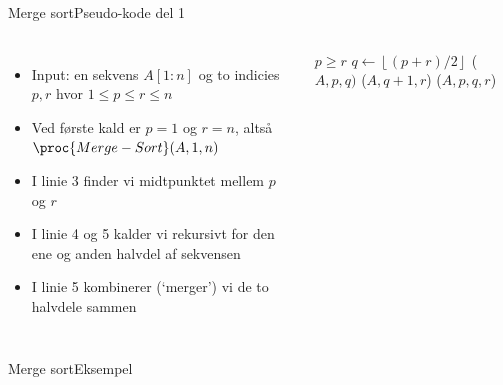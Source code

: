 \documentclass{beamer}
\newcommand{\floor}[1]{\left\lfloor #1 \right\rfloor}
\begin{document}
\begin{frame}{Merge sort}{Pseudo-kode del 1}
    \begin{columns}

        \begin{itemize}[<+->]
            \small
            \item Input: en sekvens $A[1:n]$ og to \alert{indicies} $p, r$ hvor
                $1 \leq p \leq r \leq n$
            \item Ved første kald er $p=1$ og $r=n$, altså
                $\proc{Merge-Sort}(A,1,n)$
            \item I linie 3 finder vi midtpunktet mellem $p$ og $r$
            \item I linie 4 og 5 kalder vi rekursivt for den ene og anden
                halvdel af sekvensen
            \item I linie 5 kombinerer (`merger') vi de to halvdele sammen
        \end{itemize}


        \begin{minipage}{\textwidth}
            \centering
            \begin{tcolorbox}

                \vspace{-\abovedisplayskip}
                \begin{codebox}
                    \li \If $p \geq r$ \Then
                        \li \Return
                    \End
                    \li $q \gets \floor{(p+r)/2}$
                    \li {}($A,p,q)$
                    \li {}($A,q+1,r$)
                    \li {}($A,p,q,r$)
                \end{codebox}
            \end{tcolorbox}
        \end{minipage}
        
    \end{columns}
\end{frame}

\begin{frame}{Merge sort}{Eksempel}
    
\end{frame}
\end{document}
